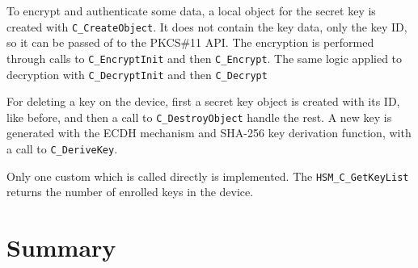 To encrypt and authenticate some data, a local object for the secret key is created with \texttt{C\_CreateObject}. It does not contain the key data, only the key ID, so it can be passed of to the PKCS\#11 API. The encryption is performed through calls to \texttt{C\_EncryptInit} and then \texttt{C\_Encrypt}.
The same logic applied to decryption with \texttt{C\_DecryptInit} and then \texttt{C\_Decrypt}

For deleting a key on the device, first a secret key object is created with its ID, like before, and then a call to \texttt{C\_DestroyObject} handle the rest.
A new key is generated with the ECDH mechanism and \ac{SHA}-256 key derivation function, with a call to \texttt{C\_DeriveKey}.

Only one custom which is called directly is implemented. The \texttt{HSM\_C\_GetKeyList} returns the number of enrolled keys in the device.

\section{Summary}\label{chap:implementation:summary}

